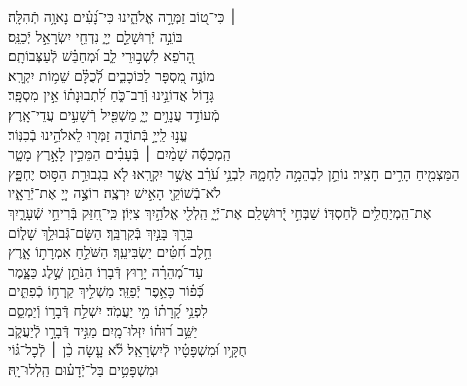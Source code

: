 \documentclass[twoside, openany, parskip=half, 11pt]{book}
\begin{document}
\begin{narrow}
 ׀ \hfill \break
כִּי־ט֭וֹב זַמְּרָ֣ה אֱלֹהֵ֑ינוּ \hfill כִּי־נָ֝עִ֗ים נָאוָ֥ה תְֿהִלָּֽה׃\\
בּוֹנֵ֣ה יְֿרֽוּשָׁלַ֣‍ִם יְיָ֑ \hfill נִדְחֵ֖י יִשְׂרָאֵ֣ל יְֿכַנֵּֽס׃\\
הָ֭רֹפֵא לִשְׁב֣וּרֵי לֵ֑ב \hfill וּ֝מְחַבֵּ֗שׁ לְֿעַצְּבוֹתָֽם׃\\
מוֹנֶ֣ה מִ֭סְפָּר לַכּוֹכָבִ֑ים \hfill לְֿ֝כֻלָּ֗ם שֵׁמ֥וֹת יִקְרָֽא׃\\
גָּד֣וֹל אֲדוֹנֵ֣ינוּ וְֿרַב־כֹּ֑חַ \hfill לִ֝תְבוּנָת֗וֹ אֵ֣ין מִסְפָּֽר׃ \\
מְֿעוֹדֵ֣ד עֲנָוִ֣ים יְיָ֑ \hfill מַשְׁפִּ֖יל רְֿשָׁעִ֣ים עֲדֵי־אָֽרֶץ׃\\
עֱנ֣וּ לַֽייָ֣ בְּֿתוֹדָ֑ה \hfill זַמְּר֖וּ לֵאלֹהֵ֣ינוּ בְֿכִנּֽוֹר׃\\
הַֽמְכַסֶּ֬ה שָׁמַ֨יִם ׀ בְּֿעָבִ֗ים \hfill הַמֵּכִ֣ין לָאָ֣רֶץ מָטָ֑ר\\ הַמַּצְמִ֖יחַ הָרִ֣ים חָצִֽיר׃ \hfill
נוֹתֵ֣ן לִבְהֵמָ֣ה לַחְמָ֑הּ לִבְנֵ֥י עֹ֝רֵ֗ב אֲשֶׁ֣ר יִקְרָֽאוּ׃ \hfill
לֹ֤א בִגְבוּרַ֣ת הַסּ֣וּס יֶחְפָּ֑ץ \\ לֹא־בְֿשׁוֹקֵ֖י הָאִ֣ישׁ יִרְצֶֽה׃ \hfill
רוֹצֶ֣ה יְיָ֭ אֶת־יְֿרֵאָ֑יו\\ אֶת־הַֽמְיַחֲלִ֥ים לְֿחַסְדּֽוֹ׃ \hfill
שַׁבְּחִ֣י יְֿ֭רוּשָׁלַ‍ִם אֶת־יְֿיָ֑ הַֽלְלִ֖י אֱלֹהַ֣יִךְ צִיּֽוֹן׃ \hfill
כִּֽי־חִ֭זַּק בְּֿרִיחֵ֣י שְֿׁעָרָ֑יִךְ\\ בֵּרַ֖ךְ בָּנַ֣יִךְ בְּֿקִרְבֵּֽךְ׃ \hfill
הַשָּׂם־גְּֿבוּלֵ֥ךְ שָׁל֑וֹם\\ חֵ֥לֶב חִ֝טִּ֗ים יַשְׂבִּיעֵֽךְ׃ \hfill
הַשֹּׁלֵ֣חַ אִמְרָת֣וֹ אָ֑רֶץ\\ עַד־מְ֝הֵרָ֗ה יָר֥וּץ דְּֿבָרֽוֹ׃ \hfill
הַנֹּתֵ֣ן שֶׁ֣לֶג כַּצָּ֑מֶר\\ כְּֿ֝פ֗וֹר כָּאֵ֥פֶר יְֿפַזֵּֽר׃ \hfill
מַשְׁלִ֣יךְ קַֽרְח֣וֹ כְֿפִתִּ֑ים\\ לִפְנֵ֥י קָ֝רָת֗וֹ מִ֣י יַעֲמֹֽד׃ \hfill
יִשְׁלַ֣ח דְּֿבָר֣וֹ וְֿיַמְסֵ֑ם\\ יַשֵּׁ֥ב ר֝וּח֗וֹ יִזְּלוּ־מָֽיִם׃ \hfill
מַגִּ֣יד דְּֿבָרָ֣ו לְֿיַעֲקֹ֑ב\\ חֻקָּ֥יו וּ֝מִשְׁפָּטָ֗יו לְֿיִשְׂרָאֵֽל׃ \hfill
לֹ֘א עָ֤שָׂה כֵ֨ן ׀ לְֿכׇל־גּ֗וֹי\\ וּמִשְׁפָּטִ֥ים בַּל־יְֿדָע֗וּם \hfill הַֽלְלוּ־יָֽהּ׃


\end{narrow}
\end{document}
